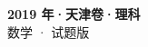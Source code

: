\documentclass[zihao=-4, a4paper]{ctexart}
\begin{document}
\begin{center}
  {\Large\bfseries 2019 年·天津卷·理科}\\[4pt]
  {\large 数学 · 试题版}
\end{center}
\medskip
{}

\end{document}
